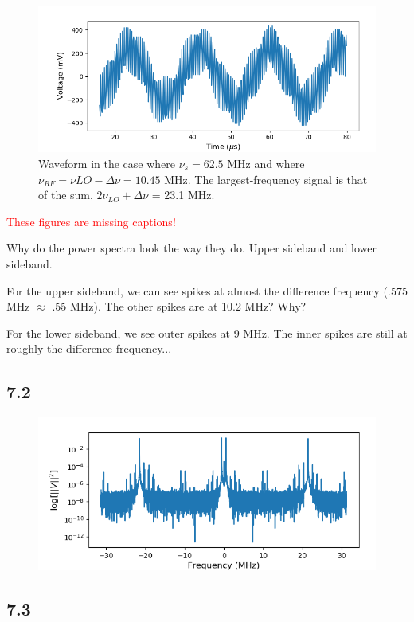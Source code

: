 \documentclass[a4paper]{article}
\begin{document}
\begin{figure}
\centering
\includegraphics[width=.8\linewidth]{7-1/low_osc}
\caption{Waveform in the case where $\nu_s = 62.5$ MHz and where $\nu_{RF} = \nu{LO} - \Delta \nu = 10.45$ MHz. The largest-frequency signal is that of the sum, $2 \nu_{LO} + \Delta \nu$ = 23.1 MHz.}
\label{fig:low_display}
\end{figure}

\textcolor{red}{These figures are missing captions!}

Why do the power spectra look the way they do. Upper sideband and lower sideband.

For the upper sideband, we can see spikes at almost the difference frequency (.575 MHz $\approx$ .55 MHz). The other spikes are at 10.2 MHz? Why?

For the lower sideband, we see outer spikes at 9 MHz. The inner spikes are still at roughly the difference frequency...

\subsection{7.2}

\begin{figure}
\centering
\includegraphics[width=.8\linewidth]{7-2}
\caption{}
\label{fig:intermods}
\end{figure}

\subsection{7.3}
\end{document}
